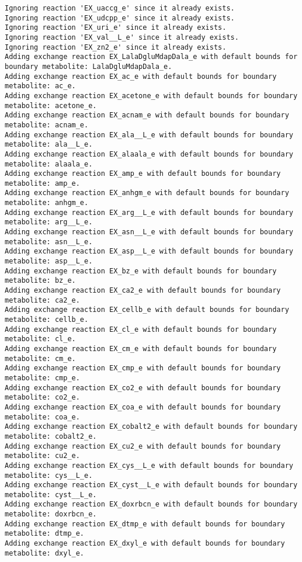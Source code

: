 \documentclass[
  letterpaper,
  DIV=11,
  numbers=noendperiod]{scrartcl}
\begin{document}
\begin{verbatim}
Ignoring reaction 'EX_uaccg_e' since it already exists.
Ignoring reaction 'EX_udcpp_e' since it already exists.
Ignoring reaction 'EX_uri_e' since it already exists.
Ignoring reaction 'EX_val__L_e' since it already exists.
Ignoring reaction 'EX_zn2_e' since it already exists.
Adding exchange reaction EX_LalaDgluMdapDala_e with default bounds for boundary metabolite: LalaDgluMdapDala_e.
Adding exchange reaction EX_ac_e with default bounds for boundary metabolite: ac_e.
Adding exchange reaction EX_acetone_e with default bounds for boundary metabolite: acetone_e.
Adding exchange reaction EX_acnam_e with default bounds for boundary metabolite: acnam_e.
Adding exchange reaction EX_ala__L_e with default bounds for boundary metabolite: ala__L_e.
Adding exchange reaction EX_alaala_e with default bounds for boundary metabolite: alaala_e.
Adding exchange reaction EX_amp_e with default bounds for boundary metabolite: amp_e.
Adding exchange reaction EX_anhgm_e with default bounds for boundary metabolite: anhgm_e.
Adding exchange reaction EX_arg__L_e with default bounds for boundary metabolite: arg__L_e.
Adding exchange reaction EX_asn__L_e with default bounds for boundary metabolite: asn__L_e.
Adding exchange reaction EX_asp__L_e with default bounds for boundary metabolite: asp__L_e.
Adding exchange reaction EX_bz_e with default bounds for boundary metabolite: bz_e.
Adding exchange reaction EX_ca2_e with default bounds for boundary metabolite: ca2_e.
Adding exchange reaction EX_cellb_e with default bounds for boundary metabolite: cellb_e.
Adding exchange reaction EX_cl_e with default bounds for boundary metabolite: cl_e.
Adding exchange reaction EX_cm_e with default bounds for boundary metabolite: cm_e.
Adding exchange reaction EX_cmp_e with default bounds for boundary metabolite: cmp_e.
Adding exchange reaction EX_co2_e with default bounds for boundary metabolite: co2_e.
Adding exchange reaction EX_coa_e with default bounds for boundary metabolite: coa_e.
Adding exchange reaction EX_cobalt2_e with default bounds for boundary metabolite: cobalt2_e.
Adding exchange reaction EX_cu2_e with default bounds for boundary metabolite: cu2_e.
Adding exchange reaction EX_cys__L_e with default bounds for boundary metabolite: cys__L_e.
Adding exchange reaction EX_cyst__L_e with default bounds for boundary metabolite: cyst__L_e.
Adding exchange reaction EX_doxrbcn_e with default bounds for boundary metabolite: doxrbcn_e.
Adding exchange reaction EX_dtmp_e with default bounds for boundary metabolite: dtmp_e.
Adding exchange reaction EX_dxyl_e with default bounds for boundary metabolite: dxyl_e.

\end{verbatim}
\end{document}
